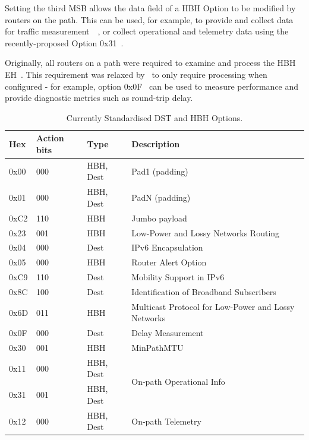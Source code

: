 \documentclass[conference]{IEEEtran}
\begin{document}
Setting the third MSB allows the data field of a HBH Option to be modified by
routers on the path. This can be used, for
example, to provide and collect data for traffic measurement~\cite{rfc9268}~\cite{rfc9343}, or collect operational and telemetry
data using the recently-proposed Option 0x31~\cite{ietf-ippm-ioam-ipv6-options-12}.  

Originally, all routers on a
path were required to examine and process the HBH EH~\cite{rfc2460}. This
requirement was relaxed by~\cite{rfc8200} to only require processing when
configured - for example, option 0x0F~\cite{rfc8250} can be used to measure
performance and provide diagnostic metrics such as round-trip delay. 


\begin{table}[b]
\center
\caption{Currently Standardised DST and HBH Options.}
\begin{tabular}{p{}|p{}|l|p{}}
Hex  & Action bits & Type      & Description                                              \\
\hline
\hline
0x00 & 000  & HBH, Dest & Pad1 (padding)                                           \\
0x01 & 000  & HBH, Dest & PadN (padding)                                           \\
0xC2 & 110  & HBH       & Jumbo payload                                  \\
0x23 & 001  & HBH       & Low-Power and Lossy Networks Routing                     \\
0x04 & 000  & Dest      & IPv6 Encapsulation                 \\
0x05 & 000  & HBH       & Router Alert Option         \\
0xC9 & 110  & Dest      & Mobility Support in IPv6                                 \\
0x8C & 100  & Dest      & Identification of Broadband Subscribers\\
0x6D & 011  & HBH       & Multicast Protocol for Low-Power and  Lossy Networks     \\
0x0F & 000  & Dest      & Delay Measurement                                        \\
0x30 & 001  & HBH       & MinPathMTU                                     \\
0x11 & 000  & HBH, Dest & \multirow{2}{*}{On-path Operational Info}                \\
0x31 & 001  & HBH, Dest &                                                          \\
0x12 & 000  & HBH, Dest & On-path Telemetry                                       
\end{tabular}
  \label{tbl:options}
\end{table}
\end{document}
